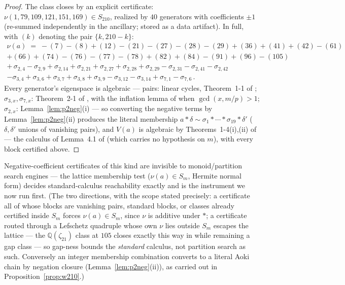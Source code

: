 \documentclass[11pt]{amsart}
\theoremstyle{remark}
\newcommand{\Q}{\mathbb{Q}}
\newcommand{\V}{V}
\newcommand{\zt}{\zeta}
\begin{document}
\begin{proof}
The class closes by an explicit
certificate: $\nu(1,79,109,121,151,169) \in S_{210}$, realized by $40$ generators with coefficients
$\pm1$ (re-summed independently in the ancillary; stored as a data artifact). In full, with $(k)$
denoting the pair $\{k,210-k\}$:
\begin{gather*}
\scriptstyle \nu(a)\;=\;
-(7)-(8)+(12)-(21)-(27)-(28)-(29)+(36)+(41)+(42)-(61)\\
\scriptstyle
+(66)+(74)-(76)-(77)-(78)+(82)+(84)-(91)+(96)-(105)\\
\scriptstyle
+\,\sigma_{2,4}-\sigma_{2,9}+\sigma_{2,14}+\sigma_{2,21}+\sigma_{2,27}+\sigma_{2,28}+\sigma_{2,29}
-\sigma_{2,31}-\sigma_{2,41}-\sigma_{2,42}\\
\scriptstyle
-\sigma_{3,4}+\sigma_{3,6}+\sigma_{3,7}+\sigma_{3,8}+\sigma_{3,9}-\sigma_{3,12}-\sigma_{3,14}
+\sigma_{7,1}-\sigma_{7,6}\,.
\end{gather*}
Every generator's eigenspace is algebraic --- pairs: linear cycles, Theorem~1-1 of \cite{Aoki87};
$\sigma_{3,x},\sigma_{7,x}$: Theorem~2-1 of \cite{Aoki87}, with the inflation lemma of \cite{BN}
when $\gcd(x,m/p)>1$; $\sigma_{2,x}$: Lemma~\ref{lem:p2neg}(i) --- so converting the negative
terms by Lemma~\ref{lem:p2neg}(ii) produces the literal
membership $a\ast\delta \sim \sigma_1\ast\cdots\ast\sigma_{19}\ast\delta'$ ($\delta,\delta'$
unions of vanishing pairs), and $\V(a)$ is algebraic by Theorems~1-4(i),(ii) of \cite{Aoki87} ---
the calculus of Lemma~4.1 of \cite{Aoki00} (which carries no hypothesis on $m$), with every block
certified above.
\end{proof}

Negative-coefficient certificates of this kind are invisible to
monoid/partition search engines --- the lattice membership test ($\nu(a)\in S_m$, Hermite normal
form) decides standard-calculus reachability exactly and is the instrument we now run first. (The
two directions, with the scope stated precisely: a certificate all of whose blocks are vanishing
pairs, standard blocks, or classes already certified inside $S_m$ forces $\nu(a)\in S_m$, since $\nu$
is additive under $*$; a certificate routed through a Lefschetz quadruple whose own $\nu$ lies
outside $S_m$ escapes the lattice --- the $\Q(\zt_{21})$ class at $105$ closes exactly this way
in \cite[Thm.~A$'$]{BN} while remaining a gap class --- so gap-ness bounds the \emph{standard}
calculus, not partition search as such. Conversely an integer membership combination converts to
a literal Aoki chain by negation closure (Lemma~\ref{lem:p2neg}(ii)), as carried out in
Proposition~\ref{prop:w210}.)
\end{document}
